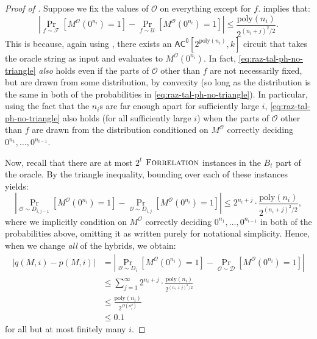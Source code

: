 \documentclass[11pt]{article}%
\newcommand{\poly}{\mathrm{poly}}
\newcommand{\Forrelation}{\normalfont\textsc{Forrelation}}
\begin{document}
\begin{proof}[Proof of ]
Suppose we fix the values of $\mathcal{O}$ on everything except for $f$.  implies that:
\begin{equation}
\label{eq:raz-tal-ph-no-triangle}
\left|\Pr_{f \sim \mathcal{F}}\left[M^\mathcal{O}\left(0^{n_i}\right) = 1\right]-\Pr_{f \sim \mathcal{U}}\left[M^\mathcal{O}\left(0^{n_i}\right) = 1 \right]\right| \le \frac{\poly(n_i)}{2^{(n_i+j)^2/2}}.
\end{equation}
This is because, again using , there exists an $\mathsf{AC^0}\left[2^{\poly(n_i)} , k\right]$ circuit that takes the oracle string as input and evaluates to $M^\mathcal{O}\left(0^{n_i}\right)$. In fact, \eqref{eq:raz-tal-ph-no-triangle} \textit{also} holds even if the parts of $\mathcal{O}$ other than $f$ are not necessarily fixed, but are drawn from some distribution, by convexity (so long as the distribution is the same in both of the probabilities in \eqref{eq:raz-tal-ph-no-triangle}). In particular, using the fact that the $n_i$s are far enough apart for sufficiently large $i$, \eqref{eq:raz-tal-ph-no-triangle} also holds (for all sufficiently large $i$) when the parts of $\mathcal{O}$ other than $f$ are drawn from the distribution conditioned on $M^\mathcal{O}$ correctly deciding $0^{n_1},\dots,0^{n_{i-1}}$.

Now, recall that there are at most $2^{t}$ $\Forrelation$ instances in the $B_t$ part of the oracle. By the triangle inequality, bounding over each of these instances yields:
\[
\left|\Pr_{\mathcal{O} \sim D_{i, j-1}}\left[M^\mathcal{O}\left(0^{n_i}\right) = 1\right]-\Pr_{\mathcal{O} \sim D_{i, j}}\left[M^\mathcal{O}\left(0^{n_i}\right) = 1 \right]\right| \le 2^{n_i + j} \cdot \frac{\poly(n_i)}{2^{(n_i+j)^2/2}},
\]
where we implicitly condition on $M^\mathcal{O}$ correctly deciding $0^{n_1},\dots,0^{n_{i-1}}$ in both of the probabilities above, omitting it as written purely for notational simplicity. Hence, when we change \textit{all} of the hybrids, we obtain:
\begin{align*}
|q(M, i) - p(M, i)| &= \left|\Pr_{\mathcal{O} \sim D_i}\left[M^\mathcal{O}\left(0^{n_i}\right) = 1\right]-\Pr_{\mathcal{O} \sim \mathcal{D}}\left[M^\mathcal{O}\left(0^{n_i}\right) = 1 \right]\right|\\
&\le \sum_{j=1}^\infty 2^{n_i + j} \cdot \frac{\poly(n_i)}{2^{(n_i + j)^2 / 2}}\\
&\le \frac{\poly(n_i)}{2^{\Omega\left(n_i^2\right)}}\\
&\le 0.1
\end{align*}
for all but at most finitely many $i$.
\end{proof}
\end{document}
